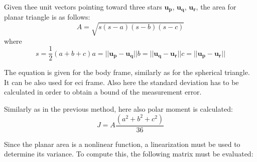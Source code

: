 \documentclass[12pt,a4paper,twoside]{article}
\begin{document}
Given thee unit vectors pointing toward three stars $\bm{u_p}$, $\bm{u_q}$, $\bm{u_r}$, the area for planar triangle is as follows:
\begin{equation}
A = \sqrt{s(s-a)(s-b)(s-c)}
\end{equation}
where
\begin{subequations}
\begin{equation}
s = \frac{1}{2}(a + b + c)
\end{equation}
\begin{equation}
a = ||\bm{u_p} - \bm{u_q}||
\end{equation}
\begin{equation}
b = ||\bm{u_q} - \bm{u_r}||
\end{equation}
\begin{equation}
c = ||\bm{u_p} - \bm{u_r}||
\end{equation}
\end{subequations}

The equation is given for the body frame, similarly as for the spherical triangle. It can be also used for \gls{eci} frame. Also here the standard deviation has to be calculated in order to obtain a bound of the measurement error.

Similarly as in the previous method, here also polar moment is calculated:
\begin{equation}
J = A\frac{(a^2 + b^2 + c^2)}{36}
\end{equation}

Since the planar area is a nonlinear function, a linearization must be used to determine its variance. To compute this, the following matrix must be evaluated:
\end{document}
